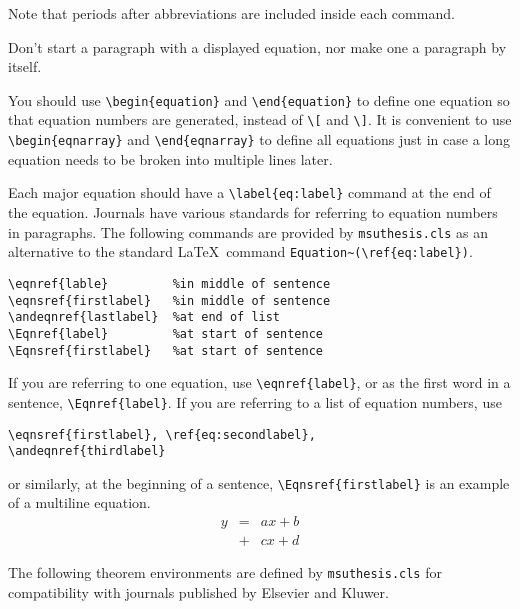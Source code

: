\noindent Note that periods after abbreviations are included
inside each command.


%
%
Don't start a paragraph with a displayed equation, nor make
one a paragraph by itself.

You should use \verb+\begin{equation}+ and \verb+\end{equation}+
to define one equation so that equation numbers are generated,
instead of \verb+\[+ and \verb+\]+.
It is convenient to use
\verb+\begin{eqnarray}+ and \verb+\end{eqnarray}+ 
to define all equations
just in case a long equation needs to be broken into
multiple lines later.

Each major equation should have a \verb+\label{eq:label}+ command
at the end of the equation.
Journals have various standards for referring 
to equation numbers in paragraphs.
The following commands are provided by {\tt msuthesis.cls}
as an alternative to 
the standard \LaTeX\ command \verb+Equation~(\ref{eq:label})+.

\newspacing{\singlespacing}\begin{verbatim}
\eqnref{lable}         %in middle of sentence
\eqnsref{firstlabel}   %in middle of sentence
\andeqnref{lastlabel}  %at end of list
\Eqnref{label}         %at start of sentence
\Eqnsref{firstlabel}   %at start of sentence
\end{verbatim}

If you are referring to one equation, use
\verb+\eqnref{label}+,
or as the first word in a sentence, \verb+\Eqnref{label}+.
If you are referring to a list of equation numbers, use

\newspacing{\singlespacing}\begin{verbatim}
\eqnsref{firstlabel}, \ref{eq:secondlabel}, 
\andeqnref{thirdlabel}
\end{verbatim}

\noindent 
or similarly, at the beginning of a sentence,
\verb+\Eqnsref{firstlabel}+ \etc
{} is an example of a multiline equation.
%
\begin{eqnarray}
y &=& a x + b
\nonumber\\
&+& c x + d
\label{eq:example}
\end{eqnarray}



%
%
The following theorem environments are defined by 
{\tt msuthesis.cls}
for compatibility with journals 
published by Elsevier and Kluwer.

